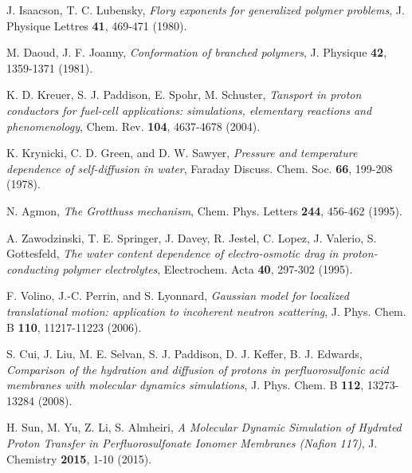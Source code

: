 \documentclass[3p,english,preprint]{elsarticle}
\newcommand{\need}[1]{\textcolor{black}{#1}}
\begin{document}
\begin{thebibliography}{00}
J. Isaacson, T. C. Lubensky, 
{\it Flory exponents for generalized polymer problems}, 
J. Physique Lettres  {\bf 41}, 469-471 (1980).


M. Daoud, J. F. Joanny, 
{\it  Conformation of branched polymers}, 
 J. Physique  {\bf 42}, 1359-1371  (1981).



K. D. Kreuer, S. J. Paddison, E. Spohr, M. Schuster, 
{\it Tansport in proton conductors for fuel-cell applications: simulations,
elementary reactions and phenomenology},
Chem. Rev. {\bf 104}, 4637-4678  (2004).




K. Krynicki, C. D. Green, and D. W. Sawyer,
{\it  Pressure and temperature dependence of self-diffusion in water}, 
Faraday Discuss. Chem. Soc. {\bf 66}, 199-208  (1978).



N. Agmon, 
{\it The Grotthuss mechanism}, 
Chem. Phys. Letters {\bf 244},  456-462 (1995). %



 A. Zawodzinski, T. E. Springer, J. Davey, R. Jestel, C. Lopez, J. Valerio, S. Gottesfeld, 
{\it The water content dependence of electro-osmotic drag in proton-conducting polymer electrolytes}, 
Electrochem. Acta {\bf 40}, 297-302 (1995).



F. Volino, J.-C. Perrin, and S. Lyonnard, 
{\it Gaussian model for localized translational motion: application to incoherent neutron scattering},
J. Phys. Chem. B {\bf 110}, 11217-11223 (2006). 
 



S. Cui, J. Liu, M. E. Selvan, S. J. Paddison, D. J. Keffer, B. J. Edwards, 
{\it Comparison of the hydration and diffusion of protons in perfluorosulfonic 
acid membranes with molecular dynamics simulations},
J. Phys. Chem. B {\bf 112}, 13273-13284 (2008).





H. Sun, M. Yu, Z. Li, S.  Almheiri, 
{\it A Molecular Dynamic Simulation of Hydrated Proton Transfer
in Perfluorosulfonate Ionomer Membranes (Nafion 117)},
J. Chemistry  {\bf 2015}, 1-10  (2015).















\end{thebibliography}
\end{document}
